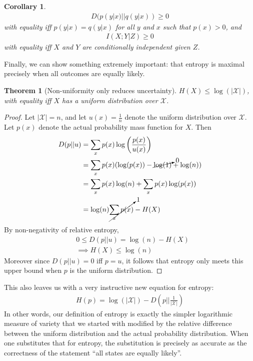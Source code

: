 \documentclass{article}
\theoremstyle{definition}
\theoremstyle{plain}
\newtheorem{theorem}{Theorem}[section]
\newtheorem{corollary}{Corollary}[section]
\begin{document}
\begin{corollary}
\begin{align}
D(p(y|x)||q(y|x)) \geq 0 
\end{align}
	with equality iff $p(y|x) = q(y|x)$ for all $y$ and $x$ such that $p(x) > 0$, and 
\begin{align}
	I(X;Y|Z) \geq 0 
\end{align}
with equality iff $X$ and $Y$ are conditionally independent given $Z$.
\end{corollary}
Finally, we can show something extremely important: that entropy is maximal precisely when all outcomes are equally likely.
\begin{theorem}[Non-uniformity only reduces uncertainty]
	$H(X) \leq \log(|\mathcal{X}|)$, with equality iff $X$ has a uniform distribution over $\mathcal{X}$. 
\end{theorem}
\begin{proof}
	Let $|\mathcal{X}| = n$, and let $u(x) = \frac{1}{n}$ denote the uniform distribution over $\mathcal{X}$. Let $p(x)$ denote the actual probability mass function for $X$. Then
\begin{align}
	D(p||u) &= \sum_x p(x)\log\left(\frac{p(x)}{u(x)}\right) \\
			&= \sum_x p(x)(\log(p(x)) - \cancelto{0}{\log(1)} + \log(n)) \\
			&= \sum_x p(x)\log(n) + \sum_x p(x)\log(p(x)) \\
			&= \log(n)\cancelto{1}{\sum_x p(x)} - H(X)
\end{align}
By non-negativity of relative entropy, 
\begin{align}
	& 0 \leq D(p||u) = \log(n)-H(X) \\
	&\implies H(X) \leq \log(n)
\end{align}
Moreover since $D(p||u) = 0$ iff $p=u$, it follows that entropy only meets this upper bound when $p$ is the uniform distribution. 
\end{proof}
This also leaves us with a very instructive new equation for entropy:
\begin{align}
	H(p) = \log(|\mathcal{X}|)-D\left( p||\frac{1}{|\mathcal{X}|} \right)
\end{align}
In other words, our definition of entropy is exactly the simpler logarithmic measure of variety that we started with modified by the relative difference between the uniform distribution and the actual probability distribution. When one substitutes that for entropy, the substitution is precisely as accurate as the correctness of the statement ``all states are equally likely''.
\end{document}
